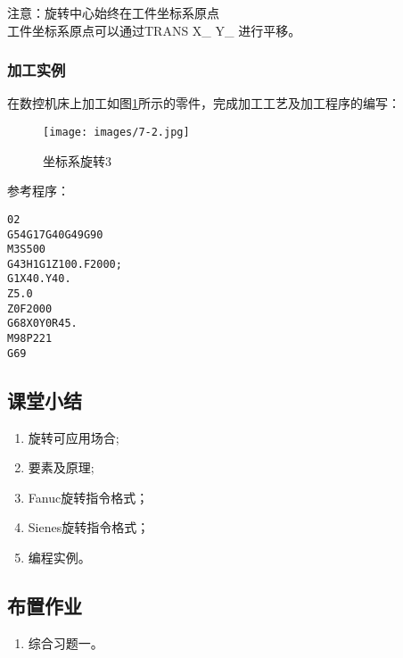 注意：旋转中心始终在工件坐标系原点\\
工件坐标系原点可以通过TRANS X\_ Y\_ 进行平移。\\

\subsubsection{加工实例}
在数控机床上加工如图\ref{坐标系旋转3}所示的零件，完成加工工艺及加工程序的编写：
\begin{figure}[!hbtp]
	\centering	\texttt{[image: images/7-2.jpg]}
	\caption{坐标系旋转3} \label{坐标系旋转3}
\end{figure}
参考程序：

\begin{lstlisting}
02
G54G17G40G49G90
M3S500
G43H1G1Z100.F2000;
G1X40.Y40.
Z5.0
Z0F2000
G68X0Y0R45.
M98P221
G69
\end{lstlisting}


\subsection{课堂小结}
\begin{enumerate}[1、]
	\item 旋转可应用场合;
	\item 要素及原理;
	\item Fanuc旋转指令格式；
	\item Sienes旋转指令格式；
	\item 编程实例。
\end{enumerate}

\vfill
\subsection{布置作业}
\begin{enumerate}[1、]
	\item 综合习题一。 
\end{enumerate}
\vfill